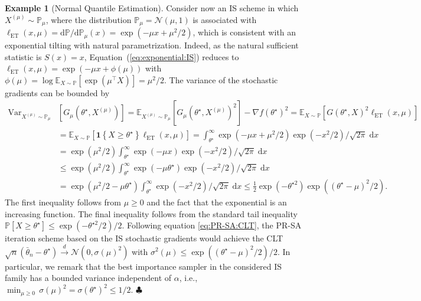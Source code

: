 \documentclass[11pt,a4paper]{article}
\theoremstyle{definition}
\newtheorem{example}[theorem]{Example}
\DeclareMathOperator*{\ET}{ET}
\newcommand{\one}[1]{\mathbf 1 \left\{ #1 \right\}}
\renewcommand{\tfrac}[2]{#1/#2}
\begin{document}
\begin{example}[Normal Quantile Estimation]
Consider now an IS scheme in which $X^{(\mu)} \sim \mathbb P_\mu$, where the distribution $\mathbb P_\mu=\mathcal N(\mu, 1)$ is associated with $\ell_\text{ET}(x, \mu) ={\mathrm{d} \mathbb P}/{\mathrm{d} \mathbb P_\mu}(x)= \exp(-\mu x + \mu^2/2)$, which is consistent with an exponential tilting with natural parametrization.
Indeed, as the natural sufficient statistic is $S(x)=x$, Equation~(\ref{eq:exponential:IS}) reduces to
\(
  \ell_{\ET}(x,\mu) = \exp(-\mu x + \phi(\mu))
\)
with $\phi(\mu) = \log \mathbb E_{X \sim \mathbb P}[ \exp(\mu^\top X) ] = \mu^2/2$. The variance of the stochastic gradients can be bounded by
\begin{align*}
 \text{Var}_{X^{(\mu)} \sim \mathbb P_\mu} &\left[G_\mu(\theta^\star,X^{(\mu)})\right]  = \mathbb E_{X^{(\mu)} \sim \mathbb P_\mu}\left[G_\mu(\theta^\star,X^{(\mu)})^2\right] - \nabla f(\theta^\star)^2
= \mathbb E_{X \sim \mathbb P}\left[G(\theta^\star,X)^2 \ell_{\text{ET}}(x, \mu)\right]\\
& = \mathbb E_{X \sim \mathbb P}\left[\one{X\geq \theta^\star} \ell_{\text{ET}}(x, \mu)\right]
= \int_{\theta^\star}^\infty \exp(-\mu x + \mu^2/2) \exp(-x^2/2)/\sqrt{2\pi} \; \text{d} x\\
& =  \exp(\mu^2/2) \int_{\theta^\star}^\infty \exp(-\mu x) \tfrac{\exp(-x^2/2)}{\sqrt{2\pi}} \; \text{d} x\\
& \leq \exp(\mu^2/2) \int_{\theta^\star}^\infty \exp(-\mu \theta^\star) \tfrac{\exp(-x^2/2)}{\sqrt{2\pi}} \; \text{d} x\\
& = \exp(\mu^2/2-\mu \theta^\star) \int_{\theta^\star}^\infty \tfrac{\exp(-x^2/2)}{\sqrt{2\pi}} \; \text{d} x \leq \frac{1}{2} \exp(-\theta^{\star 2}) \exp((\theta^\star-\mu)^2/2).
\end{align*}
The first inequality follows from $\mu\geq 0$ and the fact that the exponential is an increasing function.
The final inequality follows from the standard tail inequality
$\mathbb P[X\geq \theta^\star] \leq \exp(-\theta^{\star 2}/2)/2$.
Following equation \eqref{eq:PR-SA:CLT}, the PR-SA iteration scheme based on the IS stochastic gradients would achieve the CLT
\(
\sqrt{n}\left( \bar{\theta}_n - \theta^\star \right) \overset{d}{\to} \mathcal N \left(0, \sigma(\mu)^2  \right)
\)
with
\(
\sigma^2(\mu) \leq  \exp((\theta^\star-\mu)^2/2)/2.
\)
In particular, we remark that the best importance sampler in the considered IS family has a bounded variance independent of $\alpha$, i.e.,
\(
\min_{\mu\geq 0}\,\sigma(\mu)^2  = \sigma(\theta^\star)^2 \leq 1/2.
\) \hfill $\clubsuit$
\end{example}
\end{document}
